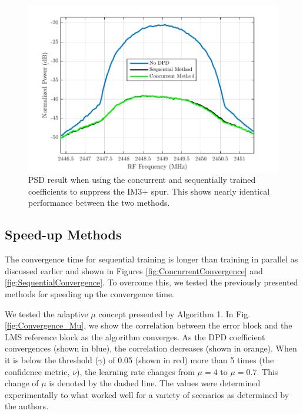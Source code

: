 \begin{figure}[t!] 
\centering
\includegraphics[width=0.9\columnwidth]{Figures/IterativeSpectrumvsConcurrent}
\caption{PSD result when using the concurrent and sequentially trained coefficients to suppress the IM3+ spur. This shows nearly identical performance between the two methods.}
\label{fig:IterativeSpectrumvsConcurrent}
\vspace{-10pt}
\end{figure}

\subsection{Speed-up Methods}
The convergence time for sequential training is longer than training in parallel as discussed earlier and shown in Figures \ref{fig:ConcurrentConvergence} and \ref{fig:SequentialConvergence}. To overcome this, we tested the previously presented methods for speeding up the convergence time.

We tested the adaptive $\mu$ concept presented by Algorithm 1. In Fig. \ref{fig:Convergence_Mu}, we show the correlation between the error block and the LMS reference block as the algorithm converges. As the DPD coefficient convergences (shown in blue), the correlation decreases (shown in orange). When it is below the threshold ($\gamma$) of 0.05 (shown in red) more than 5 times (the confidence metric, $\nu$), the learning rate changes from $\mu = 4$ to $\mu = 0.7$. This change of $\mu$ is denoted by the dashed line. The values were determined experimentally to what worked well for a variety of scenarios as determined by the authors. 

